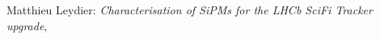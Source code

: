 \thispagestyle{empty}

\hfill

\vfill

\noindent Matthieu Leydier: \textit{Characterisation of SiPMs for the LHCb SciFi Tracker upgrade}, \ifdef{\mySubtitle}{\mySubtitle,}{} %
\textcopyright\ \myTime

%
%
%
%
%
